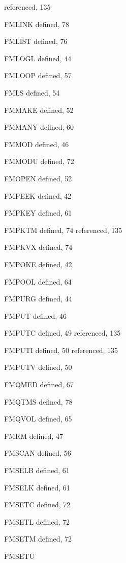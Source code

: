 \begin{theindex}
    \subitem referenced, 135
  \item FMLINK
    \subitem defined, 78
  \item FMLIST
    \subitem defined, 76
  \item FMLOGL
    \subitem defined, 44
  \item FMLOOP
    \subitem defined, 57
  \item FMLS
    \subitem defined, 54
  \item FMMAKE
    \subitem defined, 52
  \item FMMANY
    \subitem defined, 60
  \item FMMOD
    \subitem defined, 46
  \item FMMODU
    \subitem defined, 72
  \item FMOPEN
    \subitem defined, 52
  \item FMPEEK
    \subitem defined, 42
  \item FMPKEY
    \subitem defined, 61
  \item FMPKTM
    \subitem defined, 74
    \subitem referenced, 135
  \item FMPKVX
    \subitem defined, 74
  \item FMPOKE
    \subitem defined, 42
  \item FMPOOL
    \subitem defined, 64
  \item FMPURG
    \subitem defined, 44
  \item FMPUT
    \subitem defined, 46
  \item FMPUTC
    \subitem defined, 49
    \subitem referenced, 135
  \item FMPUTI
    \subitem defined, 50
    \subitem referenced, 135
  \item FMPUTV
    \subitem defined, 50
  \item FMQMED
    \subitem defined, 67
  \item FMQTMS
    \subitem defined, 78
  \item FMQVOL
    \subitem defined, 65
  \item FMRM
    \subitem defined, 47
  \item FMSCAN
    \subitem defined, 56
  \item FMSELB
    \subitem defined, 61
  \item FMSELK
    \subitem defined, 61
  \item FMSETC
    \subitem defined, 72
  \item FMSETL
    \subitem defined, 72
  \item FMSETM
    \subitem defined, 72
  \item FMSETU

\end{theindex}
